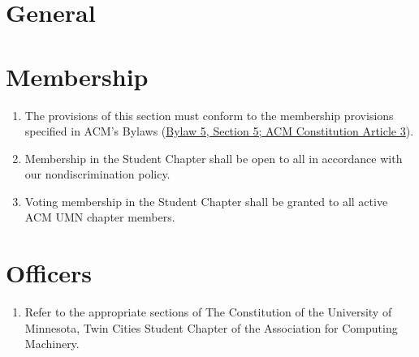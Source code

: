 





\section{General}



\section{Membership}
\begin{enumerate}
	\item The provisions of this section must conform to the membership provisions specified in ACM's Bylaws (\href{https://www.acm.org/governance/acm-bylaws#h-section-5.-membership.}{Bylaw 5, Section 5; ACM Constitution Article 3}).
	\item Membership in the Student Chapter shall be open to all in accordance with our nondiscrimination policy.
	\item Voting membership in the Student Chapter shall be granted to all active ACM UMN chapter members.
\end{enumerate}

\section{Officers}
\begin{enumerate}
	\item Refer to the appropriate sections of The Constitution of the University of Minnesota, Twin Cities Student Chapter of the Association for Computing Machinery.
\end{enumerate}

